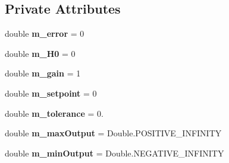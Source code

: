 \subsection*{Private Attributes}
\begin{DoxyCompactItemize}
\item 
\mbox{\label{classfrc_1_1robot_1_1controller_1_1_take_back_half_a7d8e899813fea42797eb5f46bd815c3a}} 
double {\bfseries m\+\_\+error} = 0
\item 
\mbox{\label{classfrc_1_1robot_1_1controller_1_1_take_back_half_a062106d62a3b5e5beb48fdda712b9ba9}} 
double {\bfseries m\+\_\+\+H0} = 0
\item 
\mbox{\label{classfrc_1_1robot_1_1controller_1_1_take_back_half_ac7e34ccc586d29778b91703e7971035d}} 
double {\bfseries m\+\_\+gain} = 1
\item 
\mbox{\label{classfrc_1_1robot_1_1controller_1_1_take_back_half_a17e835090031cb46733936153154adf8}} 
double {\bfseries m\+\_\+setpoint} = 0
\item 
\mbox{\label{classfrc_1_1robot_1_1controller_1_1_take_back_half_af673299e0f675ce38977a55f51027026}} 
double {\bfseries m\+\_\+tolerance} = 0.
\item 
\mbox{\label{classfrc_1_1robot_1_1controller_1_1_take_back_half_a87f22aca1b1a00ca0e791d3b0f728322}} 
double {\bfseries m\+\_\+max\+Output} = Double.\+P\+O\+S\+I\+T\+I\+V\+E\+\_\+\+I\+N\+F\+I\+N\+I\+TY
\item 
\mbox{\label{classfrc_1_1robot_1_1controller_1_1_take_back_half_a6a56ef94b0fa033cbf145639012efa11}} 
double {\bfseries m\+\_\+min\+Output} = Double.\+N\+E\+G\+A\+T\+I\+V\+E\+\_\+\+I\+N\+F\+I\+N\+I\+TY
\item 
\mbox{\label{classfrc_1_1robot_1_1controller_1_1_take_back_half_a4938afd18d500b8eeeeca2503362774a}} 

\end{DoxyCompactItemize}
